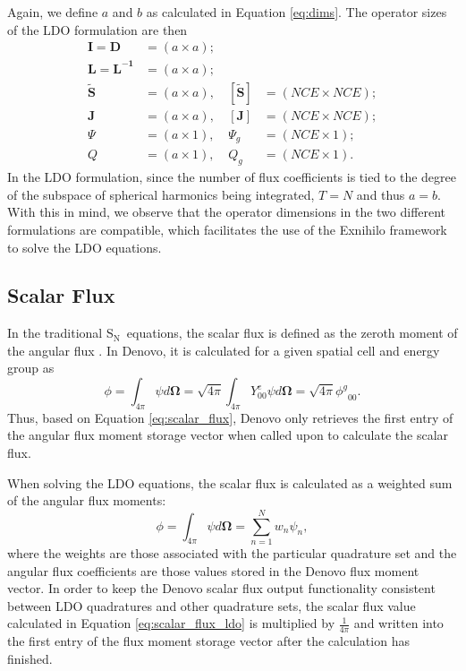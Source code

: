 \documentclass{article} %
\newcommand{\bo}{\mathbf\Omega}
\newcommand{\sn}{S$_\mathrm{N}$}
\newcommand{\ve}[1]{\ensuremath{\mathbf{#1}}}
\newcommand{\even}{\ensuremath{\phi^g}}
\begin{document}
%
Again, we define $a$ and $b$ as calculated in Equation \eqref{eq:dims}.
The operator sizes of the LDO formulation are then
%
\begin{align*}
\ve{I} = \ve{D} &=      (a \times a); \\
\ve{L} = \ve{L^{-1}} &= (a \times a); \\
\ve{\tilde{S}} &=      (a \times a),\ &[\ve{\tilde{S}}] &= (NCE \times NCE); \\
\ve{J} &=              (a \times a),\ &[\ve{J}] &= (NCE \times NCE); \\
\Psi &=                (a \times 1),\ &\Psi_g   &= (NCE \times 1); \\
Q &=                   (a \times 1),\ &Q_g      &= (NCE \times 1).
\end{align*}
%
In the LDO formulation, since the number of flux coefficients is tied
to the degree of the subspace of spherical harmonics being integrated, $T = N$
and thus $a = b$. With this in mind, we observe that the operator dimensions in
the two different formulations are compatible, which facilitates the use of the
Exnihilo framework to solve the LDO equations.

\subsection{Scalar Flux}
\label{sec:flux}

In the traditional \sn\ equations, the scalar flux is
defined as the zeroth moment of the angular flux \cite{exmm}. In Denovo, it is
calculated for a given spatial cell and energy group as
%
\begin{equation}
\phi = \int_{4\pi}\psi d\bo = \sqrt{4\pi}\int_{4\pi}Y_{00}^{e}\psi d\bo
     = \sqrt{4\pi}\even_{00}.
\label{eq:scalar_flux}
\end{equation}
%
Thus, based on Equation \eqref{eq:scalar_flux}, Denovo only retrieves
the first entry of the angular flux moment storage vector when called upon to
calculate the scalar flux.

When solving the LDO equations, the scalar flux is calculated as a 
weighted sum of the angular flux moments:
%
\begin{equation}
\phi = \int_{4\pi}\psi d\bo = \sum_{n=1}^{N}w_n\psi_n,
\label{eq:scalar_flux_ldo}
\end{equation}
%
where the weights are those associated with the particular quadrature
set and the angular flux coefficients are those values stored in the Denovo
flux moment vector. In order to keep the Denovo scalar flux output 
functionality consistent between LDO quadratures and other quadrature sets, the
scalar flux value calculated in Equation \eqref{eq:scalar_flux_ldo} is multiplied
by $\tfrac{1}{4\pi}$ and written into the first entry of the flux moment
storage vector after the calculation has finished.
\end{document}
